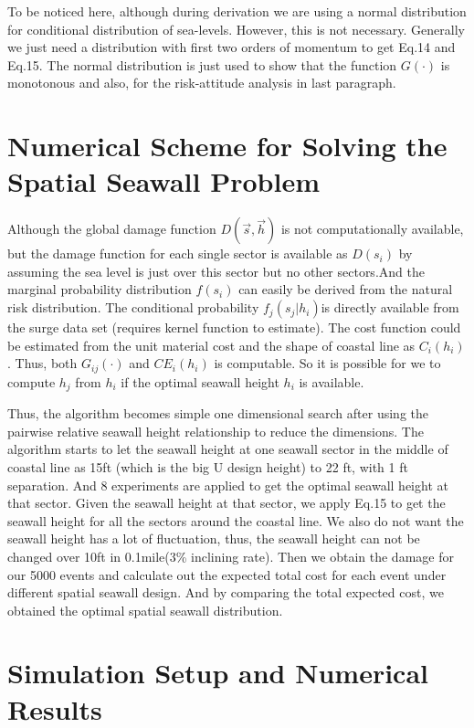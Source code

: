 \documentclass{article}
\begin{document}
To be noticed here, although during derivation we are using a normal distribution for conditional distribution of sea-levels. However, this is not necessary. Generally we just need a distribution with first two orders of momentum to get Eq.14 and Eq.15. The normal distribution is just used to show that the function $G(\cdot)$ is monotonous and also, for the risk-attitude analysis in last paragraph.

\section{Numerical Scheme for Solving the Spatial Seawall Problem}
Although the global damage function $D(\vec{s},\vec{h})$ is not computationally available, but the damage function for each single sector is available as $D(s_i)$ by assuming the sea level is just over this sector but no other sectors.And the marginal probability distribution $f(s_i)$ can easily be derived from the natural risk distribution.  The conditional probability $f_j(s_j|h_i)$is directly available from the surge data set (requires kernel function to estimate). The cost function could be estimated from the unit material cost and the shape of coastal line as $C_i(h_i)$. Thus, both $G_{ij}(\cdot)$ and $CE_i(h_i)$  is computable. So it is possible for we to compute $h_j$ from $h_i$ if the optimal seawall height $h_i$ is available. 

Thus, the algorithm becomes simple one dimensional search after using the pairwise relative seawall height relationship to reduce the dimensions. The algorithm starts to let the seawall height at one seawall sector in the middle of coastal line as 15ft (which is the big U design height) to 22 ft, with 1 ft separation. And 8 experiments are applied to get the optimal seawall height at that sector. Given the seawall height at that sector, we apply Eq.15 to get the seawall height for all the sectors around the coastal line. We also do not want the seawall height has a lot of fluctuation, thus, the seawall height can not be changed over 10ft in 0.1mile(3\% inclining rate). Then we obtain the damage for our 5000 events and calculate out the expected total cost for each event under different spatial seawall design. And by comparing the total expected cost, we obtained the optimal spatial seawall distribution.

\section{Simulation Setup and Numerical Results}
\end{document}

